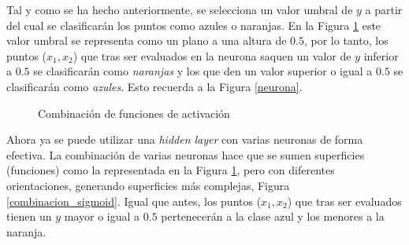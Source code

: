 \begin{itemize}
    Tal y como se ha hecho anteriormente, se selecciona un valor umbral de $y$ a partir del cual se clasificarán los puntos como azules o naranjas. En la Figura \ref{single_sigmoid} este valor umbral se representa como un plano a una altura de $0.5$, por lo tanto, los puntos ($x_1,x_2$) que tras ser evaluados en la neurona saquen un valor de $y$ inferior a $0.5$ se clasificarán como \textit{naranjas} y los que den un valor superior o igual a $0.5$ se clasificarán como \textit{azules}. Esto recuerda a la Figura \ref{neurona}.

    \vspace*{5pt}
    \begin{figure}[h!]
        \centering
            \qquad
        \caption{Combinación de funciones de activación}
        \label{single_sigmoid}
    \end{figure}
    
    Ahora ya se puede utilizar una \textit{hidden layer} con varias neuronas de forma efectiva. La combinación de varias neuronas hace que se sumen superficies (funciones) como la representada en la Figura \ref{single_sigmoid}, pero con diferentes orientaciones, generando superficies más complejas, Figura \ref{combinacion_sigmoid}. Igual que antes, los puntos ($x_1,x_2$) que tras ser evaluados tienen un $y$ mayor o igual a $0.5$ pertenecerán a la clase azul y los menores a la naranja.
    

\end{itemize}
